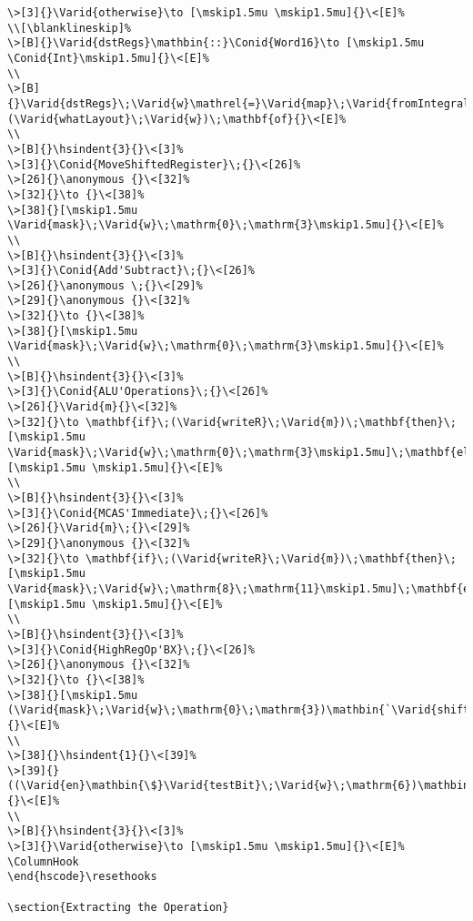 \documentclass{article}
\makeatletter
\newcommand{\Conid}[1]{\mathit{#1}}
\newcommand{\Varid}[1]{\mathit{#1}}
\newcommand{\anonymous}{\kern0.06em \vbox{\hrule\@width.5em}}
\def\resethooks{%
  \global\let\SaveRestoreHook\empty
  \global\let\ColumnHook\empty}
\newlength{\blanklineskip}
\newcommand{\hsindent}[1]{\quad}%
\makeatother
\begin{document}
\begin{Verbatim}[fontsize=\scriptsize]
\>[3]{}\Varid{otherwise}\to [\mskip1.5mu \mskip1.5mu]{}\<[E]%
\\[\blanklineskip]%
\>[B]{}\Varid{dstRegs}\mathbin{::}\Conid{Word16}\to [\mskip1.5mu \Conid{Int}\mskip1.5mu]{}\<[E]%
\\
\>[B]{}\Varid{dstRegs}\;\Varid{w}\mathrel{=}\Varid{map}\;\Varid{fromIntegral}\mathbin{\$}\mathbf{case}\;(\Varid{whatLayout}\;\Varid{w})\;\mathbf{of}{}\<[E]%
\\
\>[B]{}\hsindent{3}{}\<[3]%
\>[3]{}\Conid{MoveShiftedRegister}\;{}\<[26]%
\>[26]{}\anonymous {}\<[32]%
\>[32]{}\to {}\<[38]%
\>[38]{}[\mskip1.5mu \Varid{mask}\;\Varid{w}\;\mathrm{0}\;\mathrm{3}\mskip1.5mu]{}\<[E]%
\\
\>[B]{}\hsindent{3}{}\<[3]%
\>[3]{}\Conid{Add'Subtract}\;{}\<[26]%
\>[26]{}\anonymous \;{}\<[29]%
\>[29]{}\anonymous {}\<[32]%
\>[32]{}\to {}\<[38]%
\>[38]{}[\mskip1.5mu \Varid{mask}\;\Varid{w}\;\mathrm{0}\;\mathrm{3}\mskip1.5mu]{}\<[E]%
\\
\>[B]{}\hsindent{3}{}\<[3]%
\>[3]{}\Conid{ALU'Operations}\;{}\<[26]%
\>[26]{}\Varid{m}{}\<[32]%
\>[32]{}\to \mathbf{if}\;(\Varid{writeR}\;\Varid{m})\;\mathbf{then}\;[\mskip1.5mu \Varid{mask}\;\Varid{w}\;\mathrm{0}\;\mathrm{3}\mskip1.5mu]\;\mathbf{else}\;[\mskip1.5mu \mskip1.5mu]{}\<[E]%
\\
\>[B]{}\hsindent{3}{}\<[3]%
\>[3]{}\Conid{MCAS'Immediate}\;{}\<[26]%
\>[26]{}\Varid{m}\;{}\<[29]%
\>[29]{}\anonymous {}\<[32]%
\>[32]{}\to \mathbf{if}\;(\Varid{writeR}\;\Varid{m})\;\mathbf{then}\;[\mskip1.5mu \Varid{mask}\;\Varid{w}\;\mathrm{8}\;\mathrm{11}\mskip1.5mu]\;\mathbf{else}\;[\mskip1.5mu \mskip1.5mu]{}\<[E]%
\\
\>[B]{}\hsindent{3}{}\<[3]%
\>[3]{}\Conid{HighRegOp'BX}\;{}\<[26]%
\>[26]{}\anonymous {}\<[32]%
\>[32]{}\to {}\<[38]%
\>[38]{}[\mskip1.5mu (\Varid{mask}\;\Varid{w}\;\mathrm{0}\;\mathrm{3})\mathbin{`\Varid{shiftL}`}{}\<[E]%
\\
\>[38]{}\hsindent{1}{}\<[39]%
\>[39]{}((\Varid{en}\mathbin{\$}\Varid{testBit}\;\Varid{w}\;\mathrm{6})\mathbin{*}\mathrm{3})\mskip1.5mu]{}\<[E]%
\\
\>[B]{}\hsindent{3}{}\<[3]%
\>[3]{}\Varid{otherwise}\to [\mskip1.5mu \mskip1.5mu]{}\<[E]%
\ColumnHook
\end{hscode}\resethooks

\section{Extracting the Operation}


\end{Verbatim}
\end{document}
